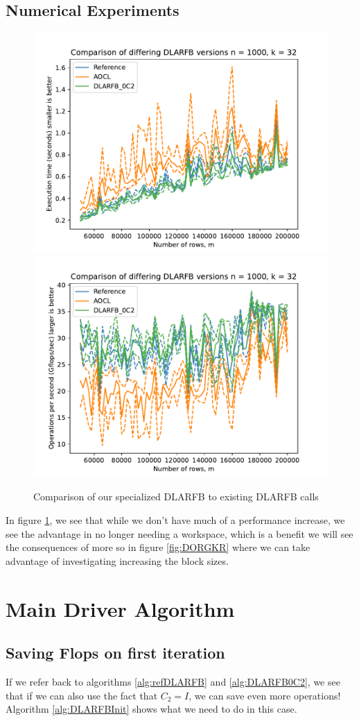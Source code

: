 \documentclass[12pt]{article}
\begin{document}
    \subsection{Numerical Experiments}
        \begin{figure}
            \centering
            \includegraphics[width=.45\textwidth]{figures/timeDLARFB.pdf}
            \includegraphics[width=.45\textwidth]{figures/flopDLARFB.pdf}
            \caption{Comparison of our specialized DLARFB to existing DLARFB calls}\label{fig:DLARFB}
        \end{figure}

        In figure \ref{fig:DLARFB}, we see that while we don't have much of a performance increase,
        we see the advantage in no longer needing a workspace, which is a benefit we will see the 
        consequences of more so in figure \ref{fig:DORGKR} where we can take advantage of investigating
        increasing the block sizes.
    \section{Main Driver Algorithm}
    \subsection{Saving Flops on first iteration}
    If we refer back to algorithms \ref{alg:refDLARFB} and \ref{alg:DLARFB0C2}, we see that if we can also
    use the fact that $C_2=I$, we can save even more operations! Algorithm \ref{alg:DLARFBInit} shows what we 
    need to do in this case.
    
\end{document}
